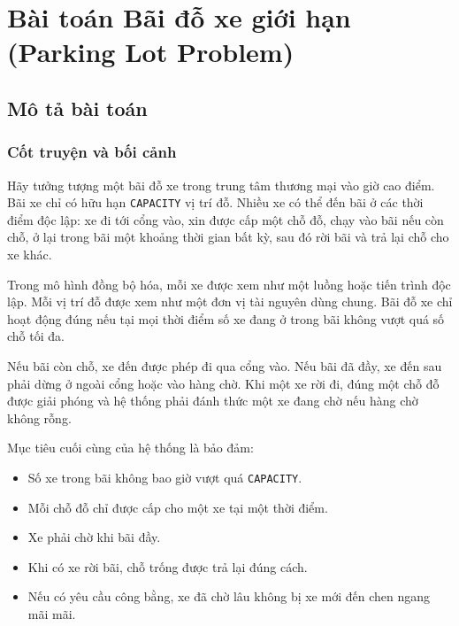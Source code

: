 \newpage
\section{Bài toán Bãi đỗ xe giới hạn (Parking Lot Problem)}

\subsection{Mô tả bài toán}

\subsubsection*{Cốt truyện và bối cảnh}

Hãy tưởng tượng một bãi đỗ xe trong trung tâm thương mại vào giờ cao điểm.
Bãi xe chỉ có hữu hạn \texttt{CAPACITY} vị trí đỗ. Nhiều xe có thể đến bãi
ở các thời điểm độc lập: xe đi tới cổng vào, xin được cấp một chỗ đỗ, chạy
vào bãi nếu còn chỗ, ở lại trong bãi một khoảng thời gian bất kỳ, sau đó
rời bãi và trả lại chỗ cho xe khác.

Trong mô hình đồng bộ hóa, mỗi xe được xem như một luồng hoặc tiến trình
độc lập. Mỗi vị trí đỗ được xem như một đơn vị tài nguyên dùng chung. Bãi
đỗ xe chỉ hoạt động đúng nếu tại mọi thời điểm số xe đang ở trong bãi không
vượt quá số chỗ tối đa.

Nếu bãi còn chỗ, xe đến được phép đi qua cổng vào. Nếu bãi đã đầy, xe đến
sau phải dừng ở ngoài cổng hoặc vào hàng chờ. Khi một xe rời đi, đúng một
chỗ đỗ được giải phóng và hệ thống phải đánh thức một xe đang chờ nếu hàng
chờ không rỗng.

Mục tiêu cuối cùng của hệ thống là bảo đảm:

\begin{itemize}
    \item Số xe trong bãi không bao giờ vượt quá \texttt{CAPACITY}.
    \item Mỗi chỗ đỗ chỉ được cấp cho một xe tại một thời điểm.
    \item Xe phải chờ khi bãi đầy.
    \item Khi có xe rời bãi, chỗ trống được trả lại đúng cách.
    \item Nếu có yêu cầu công bằng, xe đã chờ lâu không bị xe mới đến chen ngang mãi mãi.
\end{itemize}

